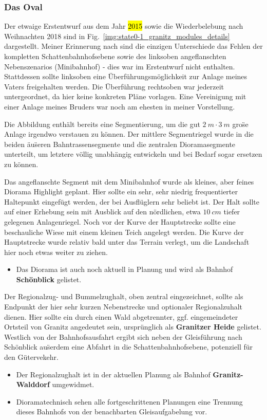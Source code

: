 \subsubsection{Das Oval}
Der etwaige Erstentwurf aus dem Jahr \hl{2015} sowie die Wiederbelebung nach Weihnachten 2018 sind in Fig.~\ref{img:state0-1_granitz_modules_details} dargestellt.
Meiner Erinnerung nach sind die einzigen Unterschiede das Fehlen der kompletten Schattenbahnhofsebene sowie des linksoben angeflanschten Nebenszenarios (Minibahnhof) - dies war im Erstentwurf nicht enthalten.
Stattdessen sollte linksoben eine \"Uberf\"uhrungsm\"oglichkeit zur Anlage meines Vaters freigehalten werden.
Die \"Uberf\"uhrung rechtsoben war jederzeit untergeordnet, da hier keine konkreten Pl\"ane vorlagen.
Eine Vereinigung mit einer Anlage meines Bruders war noch am ehesten in meiner Vorstellung.

Die Abbildung enth\"alt bereits eine Segmentierung, um die gut $2~m \cdot 3~m$ gro\"se Anlage irgendwo verstauen zu k\"onnen.
Der mittlere Segmentriegel wurde in die beiden \"au\"seren Bahntrassensegmente und die zentralen Dioramasegmente unterteilt, um letztere v\"ollig unabh\"angig entwickeln und bei Bedarf sogar ersetzen zu k\"onnen.

Das angeflanschte Segment mit dem Minibahnhof wurde als kleines, aber feines Diorama Highlight geplant.
Hier sollte ein sehr, sehr niedrig frequentierter Haltepunkt eingef\"ugt werden, der bei Ausfl\"uglern sehr beliebt ist.
Der Halt sollte auf einer Erhebung sein mit Ausblick auf den n\"ordlichen, etwa $10~cm$ tiefer gelegenen Anlagenriegel.
Noch vor der Kurve der Hauptstrecke sollte eine beschauliche Wiese mit einem kleinen Teich angelegt werden.
Die Kurve der Hauptstrecke wurde relativ bald unter das Terrain verlegt, um die Landschaft hier noch etwas weiter zu ziehen.
\begin{itemize}
	\item Das Diorama ist auch noch aktuell in Planung und wird als Bahnhof \textbf{Sch\"onblick} gelistet.
\end{itemize}

Der Regionalzug- und Bummelzughalt, oben zentral eingezeichnet, sollte als Endpunkt der hier sehr kurzen Nebenstrecke und optionaler Regionalzuhalt dienen.
Hier sollte ein durch einen Wald abgetrennter, ggf. eingemeindeter Ortsteil von Granitz angedeutet sein, urspr\"unglich als \textbf{Granitzer Heide} gelistet.
Westlich von der Bahnhofsausfahrt ergibt sich neben der Gleisf\"uhrung nach Sch\"onblick au\"serdem eine Abfahrt in die Schattenbahnhofsebene, potenziell f\"ur den G\"utervekehr.
\begin{itemize}
	\item Der Regionalzughalt ist in der aktuellen Planung als Bahnhof \textbf{Granitz-Walddorf} umgewidmet.
	\item Dioramatechnisch sehen alle fortgeschrittenen Planungen eine Trennung dieses Bahnhofs von der benachbarten Gleisaufgabelung vor.
\end{itemize}


